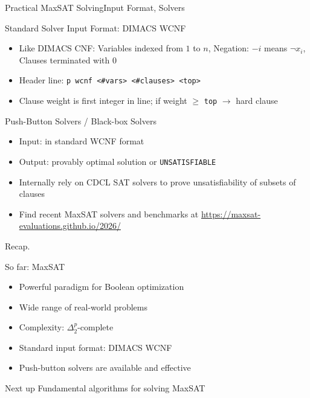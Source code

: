 \documentclass[t,english]{sdqbeamer}
\begin{document}
\begin{frame}{Practical MaxSAT Solving}{Input Format, Solvers}
\begin{block}{Standard Solver Input Format: DIMACS WCNF}
\begin{itemize}\itemsep1em
	\item Like DIMACS CNF: Variables indexed from $1$ to $n$, Negation: $-i$ means $\lnot x_i$, Clauses terminated with $0$
	\item Header line: \texttt{p wcnf <\#vars> <\#clauses> <top>}
	\item Clause weight is first integer in line; if weight $\geq$ \texttt{top} $\rightarrow$ hard clause
\end{itemize}
\end{block}
\begin{block}{Push-Button Solvers / Black-box Solvers}
\begin{itemize}\itemsep1em
	\item Input: in standard WCNF format
	\item Output: provably optimal solution or \texttt{UNSATISFIABLE}
	\item Internally rely on CDCL SAT solvers to prove unsatisfiability of subsets of clauses
	\item Find recent MaxSAT solvers and benchmarks at \url{https://maxsat-evaluations.github.io/2026/}
\end{itemize}
\end{block}
\end{frame}

\begin{frame}{Recap.}
\begin{block}{So far: MaxSAT}
	\begin{itemize}\itemsep1em
		\item Powerful paradigm for Boolean optimization
		\item Wide range of real-world problems
		\item Complexity: $\Delta_2^p$-complete
		\item Standard input format: DIMACS WCNF
		\item Push-button solvers are available and effective
	\end{itemize}
\end{block}
\begin{block}{Next up}
	Fundamental algorithms for solving MaxSAT
\end{block}
\end{frame}
\end{document}
